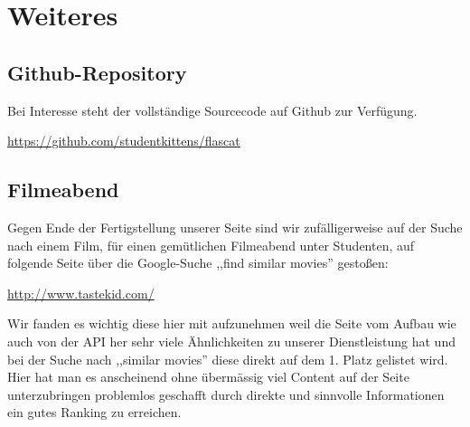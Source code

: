 \chapter{Weiteres}

\section{Github-Repository}

Bei Interesse steht der vollständige Sourcecode auf Github zur Verfügung.

\begin{center}
    \url{https://github.com/studentkittens/flascat}
\end{center}


\section{Filmeabend}
Gegen Ende der Fertigstellung unserer Seite sind wir zufälligerweise auf der
Suche nach einem Film, für einen gemütlichen Filmeabend unter Studenten, auf folgende
Seite über die Google-Suche ,,find similar movies'' gestoßen:
\begin{center}
    \url{http://www.tastekid.com/}
\end{center}
Wir fanden es wichtig diese hier mit aufzunehmen weil die Seite vom Aufbau wie
auch von der API her sehr viele Ähnlichkeiten zu unserer Dienstleistung hat und
bei der Suche nach ,,similar movies'' diese direkt auf dem 1. Platz gelistet
wird. Hier hat man es anscheinend ohne übermässig viel Content auf der Seite
unterzubringen problemlos geschafft durch direkte und sinnvolle Informationen
ein gutes Ranking zu erreichen.



